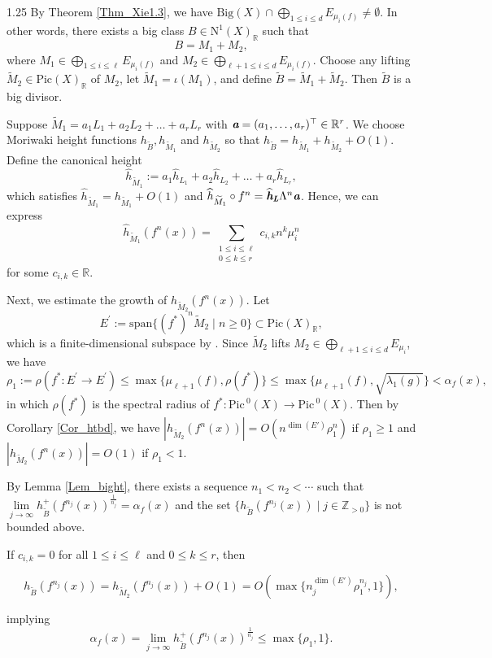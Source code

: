 \documentclass[12pt]{amsart}
\newcommand{\mb}[1]{\mathbb{#1}}
\newcommand{\mr}[1]{\mathrm{#1}}
\newcommand\ra{\rightarrow}
\newcommand\wt{\widetilde}
\newcommand\Pic{\mathrm{Pic\,}}
\newcommand{\mib}[1]{\textit{\textbf{#1}}}
\begin{document}
\begin{spacing}{1.25}
By Theorem \ref{Thm_Xie1.3}, we have $\mr{Big}(X)\cap \bigoplus\limits_{1\leq i\leq d}E_{\mu_i(f)}\neq \emptyset$. In other words, there exists a big class $B\in\mr{N}^1(X)_{\mb{R}}$ such that 
\[B=M_1+M_2,\]
where $M_1\in \bigoplus\limits_{1\leq i\leq \ell}E_{\mu_i(f)}$ and $M_2\in \bigoplus\limits_{\ell +1\leq i\leq d}E_{\mu_i(f)}$. Choose any lifting $\wt{M}_2\in \mr{Pic}(X)_{\mb{R}}$ of $M_2$, let $\wt{M}_1=\iota(M_1)$, and define $\wt{B}=\wt{M}_1+\wt{M}_2$. Then $\wt{B}$ is a big divisor. 


Suppose $\wt{M}_1=a_1L_1+a_2L_2+\dots+a_rL_r$ with $\mib{a} = (a_1, \ldots, a_r)^{\top} \in \mb{R}^r$. We choose Moriwaki height functions $h_{\wt{B}}, h_{\wt{M}_1}$ and $h_{\wt{M}_2}$ so that $h_{\wt{B}}=h_{\wt{M}_1}+h_{\wt{M}_2}+O(1)$. Define the canonical height \[\widehat{h}_{\wt{M}_1}:=a_1\widehat{h}_{L_1}+a_2\widehat{h}_{L_2}+\dots+a_r\widehat{h}_{L_r},\]
which satisfies $\widehat{h}_{\wt{M}_1}=h_{\wt{M}_1}+O(1)$ and  $\widehat{h}_{\wt{M}_1}\circ f^n=\widehat{\mib{h}}_{\mib{L}}\Lambda^n\mib{a}$. Hence, we can express
\[\widehat{h}_{\wt{M}_1}(f^n(x))=\sum_{\substack{1\leq i\leq \ell\\ 0\leq k\leq r}}c_{i,k}n^k\mu_i^{n}\]
for some $c_{i,k}\in \mb{R}$. 

Next, we estimate the growth of $h_{\wt{M}_2}(f^n(x))$. Let
\[E^{\prime}:=\mr{span}\{(f^*)^n \wt{M}_2\mid n\geq 0\}\subset \mr{Pic}(X)_{\mb{R}},\]
which is a finite-dimensional subspace by \cite[Lemma 19]{KS16}. Since $\wt{M}_2$ lifts $M_2\in \bigoplus\limits_{\ell +1\leq i\leq d}E_{\mu_i}$,  we have
\[\rho_1:=\rho(f^*:E^{\prime}\ra E^{\prime})\leq \max\{\mu_{\ell+1}(f),\rho(f^*)\}\leq \max\{\mu_{\ell+1}(f), \sqrt{\lambda_1(g)}\}<\alpha_f(x),\]
in which $\rho(f^*)$ is the spectral radius of $f^*:\Pic^0(X)\rightarrow\Pic^0(X)$. Then by Corollary \ref{Cor_htbd}, we have $|h_{\wt{M}_2}(f^n(x))|=O(n^{\dim(E')}\rho_1^n)$ if $\rho_1\geq1$ and $|h_{\wt{M}_2}(f^n(x))|=O(1)$ if $\rho_1<1$.

By Lemma \ref{Lem_bight}, there exists a sequence $n_1<n_2<\cdots$ such that $\lim\limits_{j\ra\infty}h_{\wt{B}}^+(f^{n_j}(x))^{\frac{1}{n_j}}=\alpha_f(x)$ and the set $\{h_{\wt{B}}(f^{n_j}(x))\mid j\in \mb{Z}_{>0}\}$ is not bounded above.

If $c_{i,k}=0$ for all $1\leq i\leq \ell$ and $0\leq k\leq r$, then

\[h_{\wt{B}}(f^{n_j}(x))=h_{\wt{M}_2}(f^{n_j}(x))+O(1)=O(\max\{n_j^{\dim(E')}\rho_1^{n_j},1\}),\]

implying
\[\alpha_f(x)=\lim\limits_{j\ra\infty}h_{\wt{B}}^+(f^{n_j}(x))^{\frac{1}{n_j}}\leq \max\{\rho_1,1\}.\]


\end{spacing}
\end{document}
